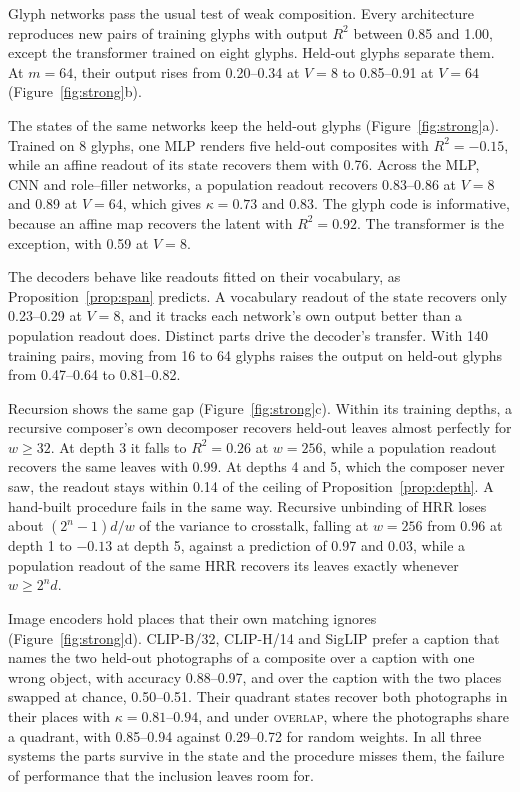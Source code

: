 \documentclass[10pt]{article}
\theoremstyle{plain}
\theoremstyle{remark}
\begin{document}
Glyph networks pass the usual test of weak composition. Every architecture reproduces new pairs of training glyphs with output $R^2$ between 0.85 and 1.00, except the transformer trained on eight glyphs. Held-out glyphs separate them. At $m = 64$, their output rises from 0.20--0.34 at $V = 8$ to 0.85--0.91 at $V = 64$ (Figure~\ref{fig:strong}b).

The states of the same networks keep the held-out glyphs (Figure~\ref{fig:strong}a). Trained on 8 glyphs, one MLP renders five held-out composites with $R^2 = -0.15$, while an affine readout of its state recovers them with 0.76. Across the MLP, CNN and role--filler networks, a population readout recovers 0.83--0.86 at $V = 8$ and 0.89 at $V = 64$, which gives $\kappa = 0.73$ and $0.83$. The glyph code is informative, because an affine map recovers the latent with $R^2 = 0.92$. The transformer is the exception, with 0.59 at $V = 8$.

The decoders behave like readouts fitted on their vocabulary, as Proposition~\ref{prop:span} predicts. A vocabulary readout of the state recovers only 0.23--0.29 at $V = 8$, and it tracks each network's own output better than a population readout does. Distinct parts drive the decoder's transfer. With 140 training pairs, moving from 16 to 64 glyphs raises the output on held-out glyphs from 0.47--0.64 to 0.81--0.82.

Recursion shows the same gap (Figure~\ref{fig:strong}c). Within its training depths, a recursive composer's own decomposer recovers held-out leaves almost perfectly for $w \ge 32$. At depth 3 it falls to $R^2 = 0.26$ at $w = 256$, while a population readout recovers the same leaves with 0.99. At depths 4 and 5, which the composer never saw, the readout stays within 0.14 of the ceiling of Proposition~\ref{prop:depth}. A hand-built procedure fails in the same way. Recursive unbinding of HRR loses about $(2^n - 1)d/w$ of the variance to crosstalk, falling at $w = 256$ from 0.96 at depth 1 to $-0.13$ at depth 5, against a prediction of 0.97 and 0.03, while a population readout of the same HRR recovers its leaves exactly whenever $w \ge 2^n d$.

Image encoders hold places that their own matching ignores (Figure~\ref{fig:strong}d). CLIP-B/32, CLIP-H/14 and SigLIP prefer a caption that names the two held-out photographs of a composite over a caption with one wrong object, with accuracy 0.88--0.97, and over the caption with the two places swapped at chance, 0.50--0.51. Their quadrant states recover both photographs in their places with $\kappa = 0.81$--$0.94$, and under \textsc{overlap}, where the photographs share a quadrant, with 0.85--0.94 against 0.29--0.72 for random weights. In all three systems the parts survive in the state and the procedure misses them, the failure of performance that the inclusion leaves room for.
\end{document}
